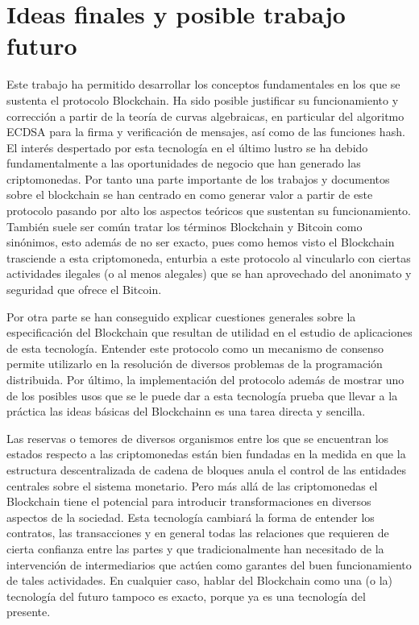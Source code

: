 \section{Ideas finales y posible trabajo futuro}
Este trabajo ha permitido desarrollar los conceptos fundamentales en los que se sustenta el protocolo Blockchain. Ha sido posible justificar su funcionamiento y corrección a partir de la teoría de curvas algebraicas, en particular del algoritmo ECDSA para la firma y verificación de mensajes, así como de las funciones hash. El interés despertado por esta tecnología en el último lustro se ha debido fundamentalmente a las oportunidades de negocio que han generado las criptomonedas. Por tanto una parte importante de los trabajos y documentos sobre el blockchain se han centrado en como generar valor a partir de este protocolo pasando por alto los aspectos teóricos que sustentan su funcionamiento. 
También suele ser común tratar los términos Blockchain y Bitcoin como sinónimos, esto además de no ser exacto, pues como hemos visto el Blockchain trasciende a esta criptomoneda, enturbia a este protocolo al vincularlo con ciertas actividades ilegales (o al menos alegales) que se han aprovechado del anonimato y seguridad que ofrece el Bitcoin.


Por otra parte se han conseguido explicar cuestiones generales sobre la especificación del Blockchain que resultan de utilidad en el estudio de aplicaciones de esta tecnología. Entender este protocolo como un mecanismo de consenso permite utilizarlo en la resolución de diversos problemas de la programación distribuida. Por último, la implementación del protocolo además de mostrar uno de los posibles usos que se le puede dar a esta tecnología prueba que llevar a la práctica las ideas básicas del Blockchainn es una tarea directa y sencilla.


Las reservas o temores de diversos organismos entre los que se encuentran los estados respecto a las criptomonedas están bien fundadas en la medida en que la estructura descentralizada de cadena de bloques anula el control de las entidades centrales sobre el sistema monetario. Pero más allá de las criptomonedas el Blockchain tiene el potencial para introducir transformaciones en diversos aspectos de la sociedad. Esta tecnología cambiará la forma de entender los contratos, las transacciones y en general todas las relaciones que requieren de cierta confianza entre las partes y que tradicionalmente han necesitado de la intervención de intermediarios que actúen como garantes del buen funcionamiento de tales actividades. En cualquier caso, hablar del Blockchain como una (o la) tecnología del futuro tampoco es exacto, porque ya es una tecnología del presente.


